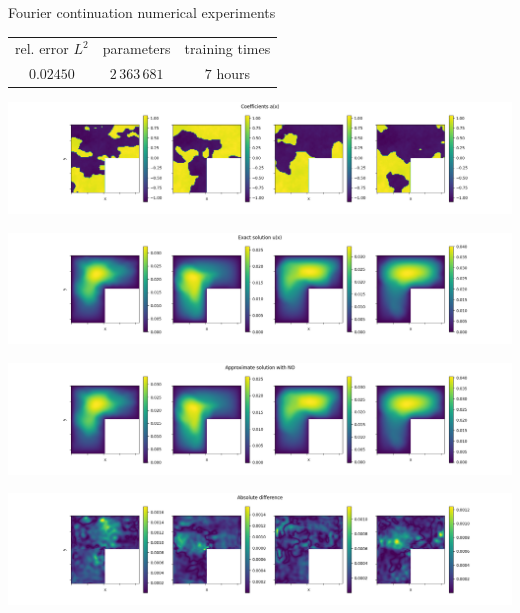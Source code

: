 \documentclass{beamer}
\begin{document}
\begin{frame}{Fourier continuation numerical experiments}
	\begin{table}[h!] %
		\centering
		\begin{tabular}{ccc}\toprule
		rel. error $ L^2 $ & parameters & training times\\
			\cmidrule{1-3}
			$ 0.02450 $ & $ 2\, 363\, 681 $ & $ 7 $ hours\\
			\bottomrule
		\end{tabular}
	\end{table}
	\begin{center}
        \begin{minipage}{0.24\textwidth}
            \includegraphics[width=\textwidth]{FNO_continuation_input.png}
        \end{minipage}
        \hfill
        \begin{minipage}{0.24\textwidth}
            \includegraphics[width=\textwidth]{FNO_continuation_output.png}
        \end{minipage}
        \hfill
        \begin{minipage}{0.24\textwidth}
            \includegraphics[width=\textwidth]{FNO_continuation_appro.png}
        \end{minipage}
        \hfill
        \begin{minipage}{0.24\textwidth}
            \includegraphics[width=\textwidth]{FNO_continuation_error.png}
        \end{minipage}
    \end{center}
\end{frame}
\end{document}
